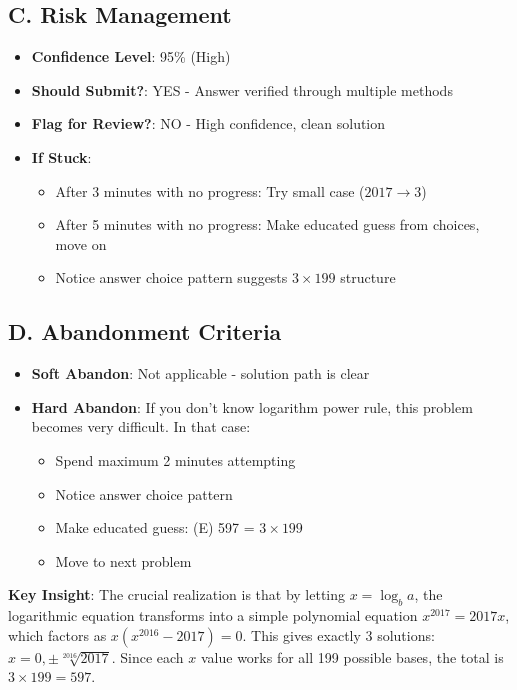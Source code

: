 \documentclass[]{article}
\begin{document}
\begin{competitionbox}
\subsection*{C. Risk Management}
\begin{itemize}[leftmargin=*]
    \item \textbf{Confidence Level}: 95\% (High)
    
    \item \textbf{Should Submit?}: YES - Answer verified through multiple methods
    
    \item \textbf{Flag for Review?}: NO - High confidence, clean solution
    
    \item \textbf{If Stuck}: 
    \begin{itemize}
        \item After 3 minutes with no progress: Try small case ($2017 \to 3$)
        \item After 5 minutes with no progress: Make educated guess from choices, move on
        \item Notice answer choice pattern suggests $3 \times 199$ structure
    \end{itemize}
\end{itemize}

\subsection*{D. Abandonment Criteria}
\begin{itemize}[leftmargin=*]
    \item \textbf{Soft Abandon}: Not applicable - solution path is clear
    
    \item \textbf{Hard Abandon}: If you don't know logarithm power rule, this problem becomes very difficult. In that case:
    \begin{itemize}
        \item Spend maximum 2 minutes attempting
        \item Notice answer choice pattern
        \item Make educated guess: (E) 597 = $3 \times 199$
        \item Move to next problem
    \end{itemize}
\end{itemize}
\end{competitionbox}

\begin{keyinsightbox}
\textbf{Key Insight}: The crucial realization is that by letting $x = \log_b a$, the logarithmic equation transforms into a simple polynomial equation $x^{2017} = 2017x$, which factors as $x(x^{2016} - 2017) = 0$. This gives exactly 3 solutions: $x = 0, \pm\sqrt[2016]{2017}$. Since each $x$ value works for all 199 possible bases, the total is $3 \times 199 = 597$.
\end{keyinsightbox}
\end{document}
